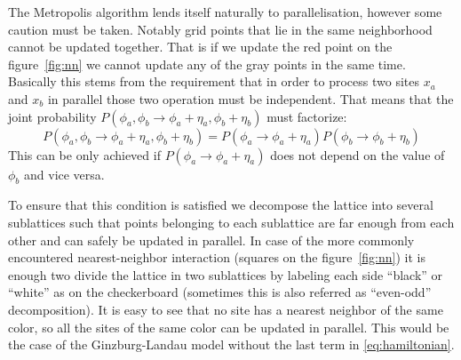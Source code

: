 \documentclass[a4paper]{llncs}
\begin{document}
The Metropolis algorithm lends itself naturally to parallelisation,
however some caution must be taken. Notably grid points that lie in
the same neighborhood cannot be updated together. That is if we update
the red point on the figure~\ref{fig:nn} we cannot update any of the
gray points in the same time.  Basically this stems from the
requirement that in order to process two sites $x_a$ and $x_b$ in
parallel those two operation must be independent.  That means that the
joint probability
$P(\phi_a,\phi_b\rightarrow\phi_a+\eta_a,\phi_b+\eta_b)$ must
factorize:
\begin{equation}
P(\phi_a,\phi_b\rightarrow\phi_a+\eta_a,\phi_b+\eta_b)
=P(\phi_a\rightarrow\phi_a+\eta_a)P(\phi_b\rightarrow\phi_b+\eta_b)
\end{equation}
This can be only achieved if $P(\phi_a\rightarrow\phi_a+\eta_a)$ does
not depend on the value of $\phi_b$ and vice versa.

To ensure that this condition is satisfied we decompose the lattice
into several sublattices such that points belonging to each sublattice
are far enough from each other and can safely be updated in
parallel. In case of the more commonly encountered nearest-neighbor
interaction (squares on the figure~\ref{fig:nn}) it is enough two
divide the lattice in two sublattices by labeling each side
``black'' or ``white'' as on the checkerboard (sometimes this is also
referred as ``even-odd'' decomposition)\cite{Checkboard}. It is easy to see that no site
has a nearest neighbor of the same color, so all the sites of the
same color can be updated in parallel. This would be the case of the
Ginzburg-Landau model without the last term in \eqref{eq:hamiltonian}.
\end{document}
